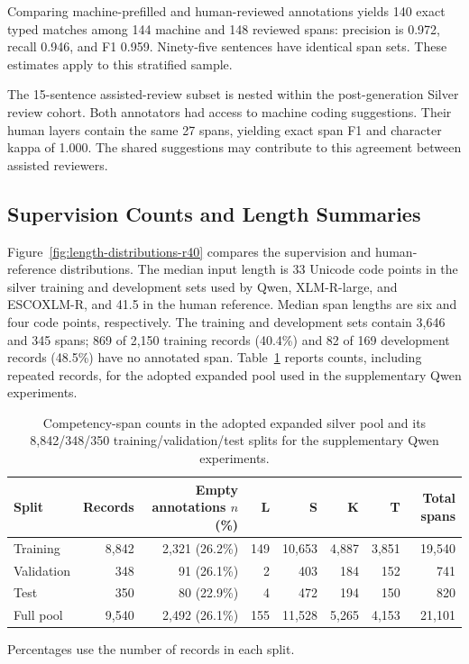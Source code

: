 Comparing machine-prefilled and human-reviewed annotations yields 140 exact typed matches among 144 machine and 148 reviewed spans: precision is 0.972, recall 0.946, and F1 0.959. Ninety-five sentences have identical span sets. These estimates apply to this stratified sample.

The 15-sentence assisted-review subset is nested within the post-generation Silver review cohort. Both annotators had access to machine coding suggestions. Their human layers contain the same 27 spans, yielding exact span F1 and character kappa of 1.000. The shared suggestions may contribute to this agreement between assisted reviewers.

\subsection{Supervision Counts and Length Summaries}
Figure~\ref{fig:length-distributions-r40} compares the supervision and human-reference distributions. The median input length is 33 Unicode code points in the silver training and development sets used by Qwen, XLM-R-large, and ESCOXLM-R, and 41.5 in the human reference. Median span lengths are six and four code points, respectively. The training and development sets contain 3,646 and 345 spans; 869 of 2,150 training records (40.4\%) and 82 of 169 development records (48.5\%) have no annotated span. Table~\ref{tab:expanded-silver-composition} reports counts, including repeated records, for the adopted expanded pool used in the supplementary Qwen experiments.

\begin{table}[htbp]
\caption{Competency-span counts in the adopted expanded silver pool and its 8,842/348/350 training/validation/test splits for the supplementary Qwen experiments.}
\label{tab:expanded-silver-composition}
\centering\small
\setlength{\tabcolsep}{4pt}
\begin{tabular}{@{}lrrrrrrr@{}}
\toprule
Split & Records & \makecell{Empty annotations\\$n$ (\%)} & L & S & K & T & Total spans \\
\midrule
Training & 8,842 & 2,321 (26.2\%) & 149 & 10,653 & 4,887 & 3,851 & 19,540 \\
Validation & 348 & 91 (26.1\%) & 2 & 403 & 184 & 152 & 741 \\
Test & 350 & 80 (22.9\%) & 4 & 472 & 194 & 150 & 820 \\
\midrule
Full pool & 9,540 & 2,492 (26.1\%) & 155 & 11,528 & 5,265 & 4,153 & 21,101 \\
\bottomrule
\end{tabular}
\par\smallskip
{\footnotesize\RaggedRight Percentages use the number of records in each split.\par}
\end{table}

